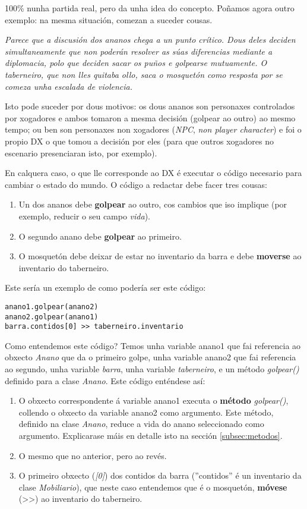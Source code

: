 100\% nunha partida real, pero da unha idea do concepto. Poñamos agora outro
exemplo: na mesma situación, comezan a suceder cousas.
\par
{\it Parece que a discusión dos ananos chega a un punto crítico. Dous deles
deciden simultaneamente que non poderán resolver as súas diferencias mediante a
diplomacia, polo que deciden sacar os puños e golpearse mutuamente. O
taberneiro, que non lles quitaba ollo, saca o mosquetón como resposta por se
comeza unha escalada de violencia.}
\par
Isto pode suceder por dous motivos: os dous ananos son personaxes
controlados por xogadores e ambos tomaron a mesma decisión (golpear ao outro) ao
mesmo tempo; ou ben son personaxes non xogadores ({\it NPC}, {\it non player
character}) e foi o propio DX o que tomou a decisión por eles (para que outros
xogadores no escenario presenciaran isto, por exemplo).
\par
En calquera caso, o que lle corresponde ao DX é executar o código necesario para
cambiar o estado do mundo. O código a redactar debe facer tres cousas:
\begin{enumerate}
  \item Un dos ananos debe {\bf golpear} ao outro, cos cambios que iso implique
  (por exemplo, reducir o seu campo {\it vida}).
  \item O segundo anano debe {\bf golpear} ao primeiro.
  \item O mosquetón debe deixar de estar no inventario da barra e debe
  {\bf moverse} ao inventario do taberneiro.
\end{enumerate}
\par
Este sería un exemplo de como podería ser este código:
\begin{lstlisting}
anano1.golpear(anano2)
anano2.golpear(anano1)
barra.contidos[0] >> taberneiro.inventario
\end{lstlisting}
\par
Como entendemos este código? Temos unha variable anano1 que fai referencia ao
obxecto {\it Anano} que da o primeiro golpe, unha variable anano2 que fai
referencia ao segundo, unha variable {\it barra}, unha variable {\it
taberneiro}, e un método {\it golpear()} definido para a clase {\it Anano}. Este
código enténdese así:
\begin{enumerate}
  \item O obxecto correspondente á variable anano1 executa o {\bf método}
  {\it golpear()}, collendo o obxecto da variable anano2 como argumento. Este
  método, definido na clase {\it Anano}, reduce a vida do anano seleccionado
  como argumento. Explicarase máis en detalle isto na sección
  \ref{subsec:metodos}.
  \item O mesmo que no anterior, pero ao revés.
  \item O primeiro obxecto ({\it [0]}) dos contidos da barra (''contidos'' é un
  inventario da clase {\it Mobiliario}), que neste caso entendemos que é o
  mosquetón, {\bf móvese} (>>) ao inventario do taberneiro. 
\end{enumerate}

